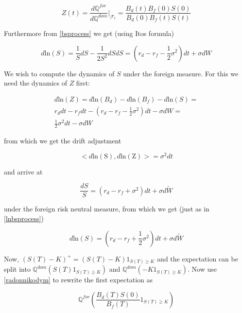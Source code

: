 \documentclass{amsart}
\theoremstyle{plain}
\numberwithin{equation}{section}
\begin{document}
\begin{equation}\label{radonnikodym}
Z(t) = \frac{d\mathbb{Q}^{for}}{d\mathbb{Q}^{dom}} \bigg|_{\mathcal{F}_t} = \frac{B_d(t)B_f(0)S(0)}{B_d(0)B_f(t)S(t)}
\end{equation}

Furthermore from \eqref{bsprocess} we get (using Itos formula)

\begin{equation}\label{lnbsprocess}
d \mathrm{ln}(S) = \frac{1}{S} dS - \frac{1}{2S^2} dS dS = \left(r_d - r_f - \frac{1}{2}\sigma^2\right) dt + \sigma dW
\end{equation}

We wish to compute the dynamics of $S$ under the foreign measure. For this we need the dynamics of $Z$ first:

\begin{eqnarray*}
d\mathrm{ln}(Z) = d\mathrm{ln}(B_d)-d\mathrm{ln}(B_f)-d\mathrm{ln}(S) = \\
r_d dt - r_f dt - \left(r_d-r_f-\frac{1}{2}\sigma^2\right)dt-\sigma dW = \\
\frac{1}{2}\sigma^2 dt - \sigma dW
\end{eqnarray*}

from which we get the drift adjustment

\begin{equation*}
<d\mathrm{ln(S)}, d\mathrm{ln(Z)}> = \sigma^2 dt
\end{equation*}

and arrive at

\begin{equation}
\frac{dS}{S} = (r_d - r_f + \sigma^2) dt + \sigma d\widetilde{W}
\end{equation}

under the foreign risk neutral measure, from which we get (just as in \ref{lnbsprocess})

\begin{equation}\label{lnbsprocess2}
d \mathrm{ln}(S) = \left(r_d - r_f + \frac{1}{2}\sigma^2\right) dt + \sigma d\widetilde{W}
\end{equation}


Now, $(S(T)-K)^+ = (S(T)-K)\mathrm{1}_{S(T)\geq K}$ and the expectation can be split into $\mathbb{Q}^{dom}(S(T)\mathrm{1}_{S(T)\geq K})$ and
$\mathbb{Q}^{dom}(-K{1}_{S(T)\geq K})$. Now use \ref{radonnikodym} to rewrite the first expectation as

\begin{equation}
\mathbb{Q}^{for}\left(\frac{B_d(T)S(0)}{B_f(T)}\mathrm{1}_{S(T)\geq K}\right)
\end{equation}
\end{document}
